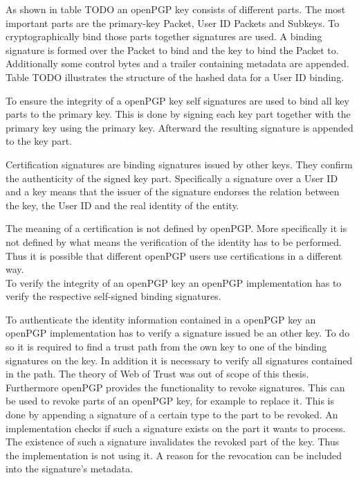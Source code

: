 As shown in table TODO an openPGP key consists of different parts. The most important parts are the primary-key Packet, User ID Packets and Subkeys. To cryptographically bind those parts together signatures are used. A binding signature is formed over the Packet to bind and the key to bind the Packet to. Additionally some control bytes and a trailer containing metadata are appended.  \\

Table TODO illustrates the structure of the hashed data for a User ID binding.


To ensure the integrity of a openPGP key self signatures are used to bind all key parts to the primary key. This is done by signing each key part together with the primary key using the primary key. Afterward the resulting signature is appended to the key part.

Certification signatures are binding signatures issued by other keys. They confirm the authenticity of the signed key part. Specifically a signature over a User ID and a key means that the issuer of the signature endorses the relation between the key, the User ID and the real identity of the entity.

The meaning of a certification is not defined by openPGP. More specifically it is not defined by what means the verification of the identity has to be performed. Thus it is possible that different openPGP users use certifications in a different way. \\

To verify the integrity of an openPGP key an openPGP implementation has to verify the respective self-signed binding signatures. 

To authenticate the identity information contained in a openPGP key an openPGP implementation has to verify a signature issued be an other key. To do so it is required to find a trust path from the own key to one of the binding signatures on the key. In addition it is necessary to verify all signatures contained in the path. The theory of Web of Trust was out of scope of this thesis. \\

Furthermore openPGP provides the functionality to revoke signatures. This can be used to revoke parts of an openPGP key, for example to replace it. This is done by appending a signature of a certain type to the part to be revoked. An implementation checks if such a signature exists on the part it wants to process. The existence of such a signature invalidates the revoked part of the key. Thus the implementation is not using it. A reason for the revocation can be included into the signature's metadata. 

